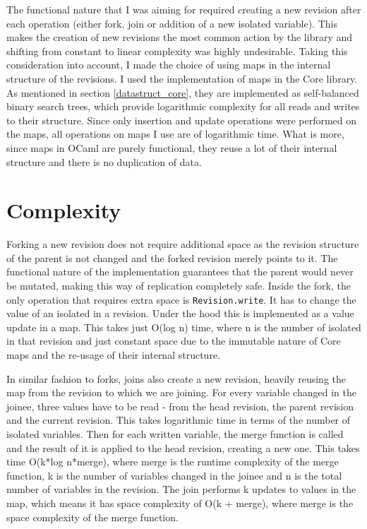 \documentclass[12pt,twoside,notitlepage]{report}
\begin{document}
{The functional nature that I was aiming for required creating a new revision after each operation (either fork, join or addition of a new isolated variable). This makes the creation of new revisions the most common action by the library and shifting from constant to linear complexity was highly undesirable. Taking this consideration into account, I made the choice of using maps in the internal structure of the revisions. I used the implementation of maps in the Core library. As mentioned in section \ref{datastruct_core}, they are implemented as self-balanced binary search trees, which provide logarithmic complexity for all reads and writes to their structure. Since only insertion and update operations were performed on the maps, all operations on maps I use are of logarithmic time. What is more, since maps in OCaml are purely functional, they reuse a lot of their internal structure and there is no duplication of data. 

\section{Complexity}
\label{complexity}
Forking a new revision does not require additional space as the revision structure of the parent is not changed and the forked revision merely points to it. The functional nature of the implementation guarantees that the parent would never be mutated, making this way of replication completely safe. Inside the fork, the only operation that requires extra space is {\tt Revision.write}. It has to change the value of an isolated in a revision. Under the hood this is implemented as a value update in a map. This takes just O(log n) time, where n is the number of isolated in that revision and just constant space due to the immutable nature of Core maps and the re-usage of their internal structure. 

In similar fashion to forks, joins also create a new revision, heavily reusing the map from the revision to which we are joining. For every variable changed in the joinee, three values have to be read - from the head revision, the parent revision and the current revision. This takes logarithmic time in terms of the number of isolated variables. Then for each written variable, the merge function is called and the result of it is applied to the head revision, creating a new one. This takes time O(k*log n*merge), where merge is the runtime complexity of the merge function, k is the number of variables changed in the joinee and n is the total number of variables in the revision. The join performs k updates to values in the map, which means it has space complexity of O(k + merge), where merge is the space complexity of the merge function. 

}
\end{document}
